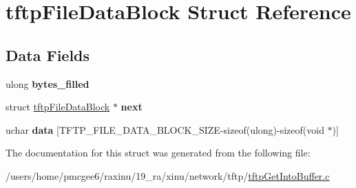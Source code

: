 \hypertarget{structtftpFileDataBlock}{\section{tftp\-File\-Data\-Block Struct Reference}
\label{structtftpFileDataBlock}
}
\subsection*{Data Fields}
\begin{DoxyCompactItemize}
\item 
\hypertarget{structtftpFileDataBlock_ac2693d08a2135e7c61d5ba45db3589cc}{ulong {\bfseries bytes\-\_\-filled}}\label{structtftpFileDataBlock_ac2693d08a2135e7c61d5ba45db3589cc}

\item 
\hypertarget{structtftpFileDataBlock_a79ba02e5b5fa5dccf33c65457ecc52d4}{struct \hyperlink{structtftpFileDataBlock}{tftp\-File\-Data\-Block} $\ast$ {\bfseries next}}\label{structtftpFileDataBlock_a79ba02e5b5fa5dccf33c65457ecc52d4}

\item 
\hypertarget{structtftpFileDataBlock_a7ba2612cef5135273ccb5e7f3248aa06}{uchar {\bfseries data} \mbox{[}T\-F\-T\-P\-\_\-\-F\-I\-L\-E\-\_\-\-D\-A\-T\-A\-\_\-\-B\-L\-O\-C\-K\-\_\-\-S\-I\-Z\-E-\/sizeof(ulong)-\/sizeof(void $\ast$)\mbox{]}}\label{structtftpFileDataBlock_a7ba2612cef5135273ccb5e7f3248aa06}

\end{DoxyCompactItemize}


The documentation for this struct was generated from the following file\-:\begin{DoxyCompactItemize}
\item 
/users/home/pmcgee6/raxinu/19\-\_\-ra/xinu/network/tftp/\hyperlink{tftpGetIntoBuffer_8c}{tftp\-Get\-Into\-Buffer.\-c}\end{DoxyCompactItemize}
